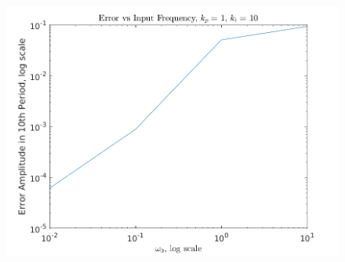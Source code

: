 \documentclass[11pt]{article}
\theoremstyle{definition}
\begin{document}
\begin{enumerate}
\begin{enumerate}
        \begin{figure}
            \centering
            \includegraphics{ES155P1_4ciii_error.png}
            \caption{}
            \label{fig.error_iii}
        \end{figure}
        
    \end{enumerate}

\end{enumerate}
\end{document}
